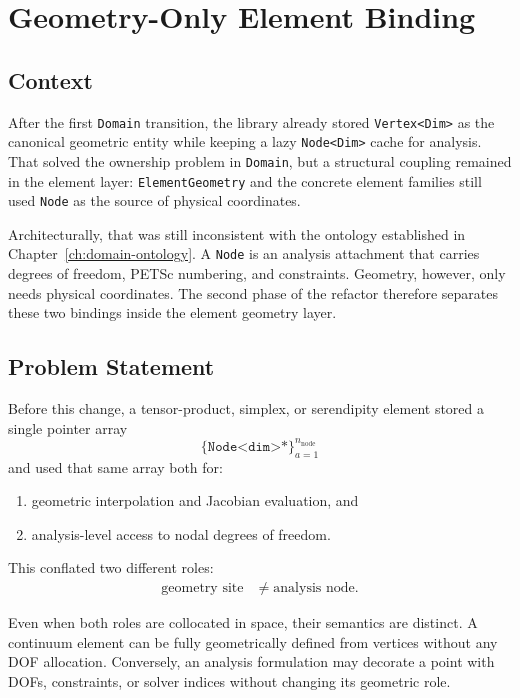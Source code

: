 \chapter{Geometry-Only Element Binding}

\section{Context}

After the first \texttt{Domain} transition, the library already stored
\texttt{Vertex<Dim>} as the canonical geometric entity while keeping a lazy
\texttt{Node<Dim>} cache for analysis.  That solved the ownership problem in
\texttt{Domain}, but a structural coupling remained in the element layer:
\texttt{ElementGeometry} and the concrete element families still used
\texttt{Node} as the source of physical coordinates.

Architecturally, that was still inconsistent with the ontology established in
Chapter~\ref{ch:domain-ontology}.  A \texttt{Node} is an analysis attachment
that carries degrees of freedom, PETSc numbering, and constraints.  Geometry,
however, only needs physical coordinates.  The second phase of the refactor
therefore separates these two bindings inside the element geometry layer.

\section{Problem Statement}

Before this change, a tensor-product, simplex, or serendipity element stored a
single pointer array
\[
  \{\texttt{Node<dim>*}\}_{a=1}^{n_\mathrm{node}}
\]
and used that same array both for:
\begin{enumerate}[nosep]
  \item geometric interpolation and Jacobian evaluation, and
  \item analysis-level access to nodal degrees of freedom.
\end{enumerate}

This conflated two different roles:
\begin{align*}
  \text{geometry site} &\neq \text{analysis node}.
\end{align*}

Even when both roles are collocated in space, their semantics are distinct.  A
continuum element can be fully geometrically defined from vertices without any
DOF allocation.  Conversely, an analysis formulation may decorate a point with
DOFs, constraints, or solver indices without changing its geometric role.

